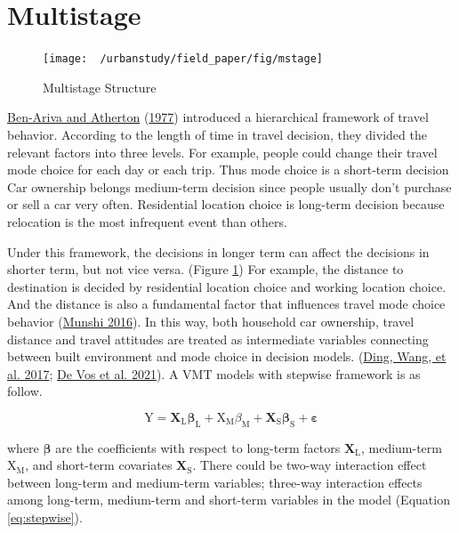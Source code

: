 \documentclass[
  11pt,
  openany]{memoir}
\begin{document}
\hypertarget{multistage}{%
\section{Multistage}\label{multistage}}

\begin{figure}

{\centering \texttt{[image: ~/urbanstudy/field\_paper/fig/mstage]} 

}

\caption{Multistage Structure}\label{fig:Mstage}
\end{figure}

\protect\hyperlink{ref-ben-arivaMETHODOLOGYSHORTRANGETRAVEL1977}{Ben-Ariva and Atherton} (\protect\hyperlink{ref-ben-arivaMETHODOLOGYSHORTRANGETRAVEL1977}{1977}) introduced a hierarchical framework of travel behavior. According to the length of time in travel decision, they divided the relevant factors into three levels. For example, people could change their travel mode choice for each day or each trip. Thus mode choice is a short-term decision
Car ownership belongs medium-term decision since people usually don't purchase or sell a car very often.
Residential location choice is long-term decision because relocation is the most infrequent event than others.

Under this framework, the decisions in longer term can affect the decisions in shorter term, but not vice versa. (Figure \ref{fig:Mstage})
For example, the distance to destination is decided by residential location choice and working location choice. And the distance is also a fundamental factor that influences travel mode choice behavior (\protect\hyperlink{ref-munshiBuiltEnvironmentMode2016}{Munshi 2016}).
In this way, both household car ownership, travel distance and travel attitudes are treated as intermediate variables connecting between built environment and mode choice in decision models. (\protect\hyperlink{ref-dingExploringInfluenceBuilt2017}{Ding, Wang, et al. 2017}; \protect\hyperlink{ref-devosIndirectEffectBuilt2021}{De Vos et al. 2021}).
A VMT models with stepwise framework is as follow.

\begin{equation}
\label{eq:stepwise}
\mathrm{Y}=\mathbf{X}_\mathrm{L}\boldsymbol{\beta}_\mathrm{L}+\mathrm{X_{M}}{\beta}_\mathrm{M}+\mathbf{X}_\mathrm{S}\boldsymbol{\beta}_\mathrm{S}+\boldsymbol{\varepsilon}
\end{equation}

where \(\boldsymbol{\beta}\) are the coefficients with respect to long-term factors \(\mathbf{X}_\mathrm{L}\), medium-term \(\mathrm{X_{M}}\), and short-term covariates \(\mathbf{X}_\mathrm{S}\).
There could be two-way interaction effect between long-term and medium-term variables; three-way interaction effects among long-term, medium-term and short-term variables in the model (Equation \eqref{eq:stepwise}).
\end{document}
